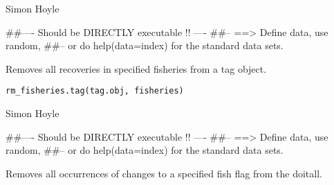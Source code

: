 \documentclass[a4paper]{book}
\begin{document}
%
\begin{Author}\relax

Simon Hoyle
\end{Author}
%
\begin{Examples}
\begin{ExampleCode}
##---- Should be DIRECTLY executable !! ----
##-- ==>  Define data, use random,
##--	or do  help(data=index)  for the standard data sets.

\end{ExampleCode}
\end{Examples}
%
\begin{Description}\relax

Removes all recoveries in specified fisheries from a tag object. 
\end{Description}
%
\begin{Usage}
\begin{verbatim}
rm_fisheries.tag(tag.obj, fisheries)
\end{verbatim}
\end{Usage}
%
\begin{Arguments}
\begin{ldescription}
\item[\code{tag.obj}] 


\item[\code{fisheries}] 


\end{ldescription}
\end{Arguments}
%
\begin{Author}\relax

Simon Hoyle
\end{Author}
%
\begin{Examples}
\begin{ExampleCode}
##---- Should be DIRECTLY executable !! ----
##-- ==>  Define data, use random,
##--	or do  help(data=index)  for the standard data sets.

\end{ExampleCode}
\end{Examples}
%
\begin{Description}\relax

Removes all occurrences of changes to a specified fish flag from the doitall. 
\end{Description}
\end{document}
